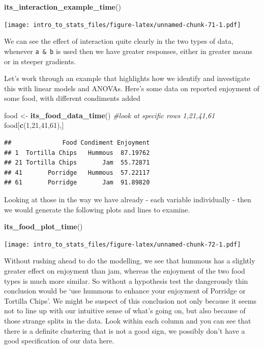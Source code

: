\documentclass[
]{book}
\newenvironment{Shaded}{\begin{snugshade}}{\end{snugshade}}
\newcommand{\CommentTok}[1]{\textcolor[rgb]{0.56,0.35,0.01}{\textit{#1}}}
\newcommand{\DecValTok}[1]{\textcolor[rgb]{0.00,0.00,0.81}{#1}}
\newcommand{\KeywordTok}[1]{\textcolor[rgb]{0.13,0.29,0.53}{\textbf{#1}}}
\newcommand{\NormalTok}[1]{#1}
\newcommand{\StringTok}[1]{\textcolor[rgb]{0.31,0.60,0.02}{#1}}
\begin{document}
\begin{Shaded}
\begin{Highlighting}[]
\KeywordTok{its_interaction_example_time}\NormalTok{()}
\end{Highlighting}
\end{Shaded}

\texttt{[image: intro\_to\_stats\_files/figure-latex/unnamed-chunk-71-1.pdf]}

We can see the effect of interaction quite clearly in the two types of data, whenever \texttt{a\ \&\ b} is used then we have greater responses, either in greater means or in steeper gradients.

Let's work through an example that highlights how we identify and investigate this with linear models and ANOVAs. Here's some data on reported enjoyment of some food, with different condiments added

\begin{Shaded}
\begin{Highlighting}[]
\NormalTok{food <-}\StringTok{ }\KeywordTok{its_food_data_time}\NormalTok{()}
\CommentTok{#look at specific rows 1,21,41,61}
\NormalTok{food[}\KeywordTok{c}\NormalTok{(}\DecValTok{1}\NormalTok{,}\DecValTok{21}\NormalTok{,}\DecValTok{41}\NormalTok{,}\DecValTok{61}\NormalTok{),]                                      }
\end{Highlighting}
\end{Shaded}

\begin{verbatim}
##              Food Condiment Enjoyment
## 1  Tortilla Chips   Hummous  87.19762
## 21 Tortilla Chips       Jam  55.72871
## 41       Porridge   Hummous  57.22117
## 61       Porridge       Jam  91.89820
\end{verbatim}

Looking at those in the way we have already - each variable individually - then we would generate the following plots and lines to examine.

\begin{Shaded}
\begin{Highlighting}[]
\KeywordTok{its_food_plot_time}\NormalTok{()}
\end{Highlighting}
\end{Shaded}

\texttt{[image: intro\_to\_stats\_files/figure-latex/unnamed-chunk-72-1.pdf]}

Without rushing ahead to do the modelling, we see that hummous has a slightly greater effect on enjoyment than jam, whereas the enjoyment of the two food types is much more similar. So without a hypothesis test the dangerously thin conclusion would be `use hummous to enhance your enjoyment of Porridge or Tortilla Chips'. We might be suspect of this conclusion not only because it seems not to line up with our intuitive sense of what's going on, but also because of those strange splits in the data. Look within each column and you can see that there is a definite clustering that is not a good sign, we possibly don't have a good specification of our data here.
\end{document}
